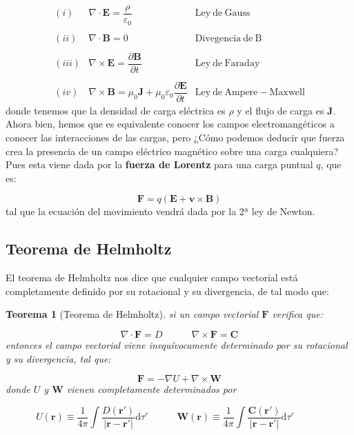 \documentclass[12pt,a4paper]{article}
\newcommand{\D}{\mathrm{d}}
\newcommand{\tquad}{\quad \quad \quad}
\newcommand{\rota}{\nabla \times}
\newcommand{\dive}{\nabla \cdot}
\newcommand{\Bn}{\mathbf{B}}
\newcommand{\En}{\mathbf{E}}
\newcommand{\Jn}{\mathbf{J}}
\newcommand{\Fn}{\mathbf{F}}
\newcommand{\vn}{\mathbf{v}}
\newcommand{\rn}{\mathbf{r}}
\newcommand{\Cn}{\mathbf{C}}
\newcommand{\Wn}{\mathbf{W}}
\newtheorem{theorem}{Teorema}[section]
\numberwithin{equation}{section}
\numberwithin{figure}{section}
\begin{document}
\begin{equation}
\begin{array}{rll}
(i) & \dive \En = \dfrac{\rho}{\varepsilon_0}  & \mathrm{Ley \ de \ Gauss} \\ \\
(ii) & \dive \Bn = 0  & \mathrm{Divegencia \ de \ B} \\ \\
(iii) & \rota \En = \dfrac{\partial \Bn}{ \partial t}  & \mathrm{Ley \ de \ Faraday} \\ \\
(iv) & \rota \Bn = \mu_0 \Jn + \mu_0 \varepsilon_0 \dfrac{\partial \En}{\partial t} & \mathrm{Ley \ de \ Ampere-Maxwell} 
\end{array} \label{Ec:01.1.01}
\end{equation}
donde tenemos que la densidad de carga eléctrica es $\rho$ y el flujo de carga es $\Jn$. Ahora bien, hemos que es equivalente conocer los campos electromangéticos a conocer las interacciones de las cargas, pero ¿Cómo podemos deducir que fuerza crea la presencia de un campo eléctrico  magnético sobre una carga cualquiera? Pues esta viene dada por la \textbf{fuerza de Lorentz} para una carga puntual $q$, que es:

\begin{equation}
\Fn = q (\En + \vn \times \Bn) \label{Ec:01.1.02}
\end{equation}
tal que la ecuación del movimiento vendrá dada por la 2ª ley de Newton. 


\subsection{Teorema de Helmholtz}

El teorema de Helmholtz nos dice que cualquier campo vectorial está completamente definido por su rotacional y su divergencia, de tal modo que:

\begin{theorem}[Teorema de Helmholtz]
si un campo vectorial $\Fn$ verifica que:

\begin{equation}
\dive \Fn = D \tquad \rota \Fn = \Cn
\end{equation}
entonces el campo vectorial viene inequívocamente determinado por su rotacional y su divergencia, tal que:

\begin{equation}
\Fn = - \nabla  U + \rota \Wn
\end{equation}
donde $U$ y $\Wn$ vienen completamente determinados por

\begin{equation}
U(\rn) \equiv \dfrac{1}{4 \pi} \int \dfrac{D (\rn')}{|\rn - \rn'|} \D \tau' \tquad 
\Wn (\rn) \equiv \dfrac{1}{4 \pi}  \int \dfrac{\Cn (\rn')}{|\rn - \rn'|} \D \tau' \tquad 
\end{equation}
\end{theorem}
\end{document}
